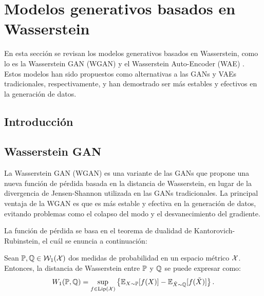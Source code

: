 \chapter{Modelos generativos basados en Wasserstein}
\label{chap:modelos-generativos-basados-en-Wasserstein}
{
    En esta sección se revisan los modelos generativos basados en Wasserstein, como lo es la Wasserstein GAN (WGAN) \cite{arjovsky2017wasserstein} y el Wasserstein Auto-Encoder (WAE) \cite{tolstikhin2017wasserstein}. Estos modelos han sido propuestos como alternativas a las GANs y VAEs tradicionales, respectivamente, y han demostrado ser más estables y efectivos en la generación de datos.

    \section{Introducción}\label{sec:model-gen-wass-Introducción}
    {

    }  %

    \section{Wasserstein GAN}\label{sec:WGAN}
    {
        La Wasserstein GAN (WGAN) \cite{arjovsky2017wasserstein} es una variante de las GANs que propone una nueva función de pérdida basada en la distancia de Wasserstein, en lugar de la divergencia de Jensen-Shannon utilizada en las GANs tradicionales. La principal ventaja de la WGAN es que es más estable y efectiva en la generación de datos, evitando problemas como el colapso del modo y el desvanecimiento del gradiente.

        La función de pérdida se basa en el teorema de dualidad de Kantorovich-Rubinstein, el cuál se enuncia a continuación:
        \begin{theorem}\label{thm:dualidad-kantorovich-rubinstein}
            Sean $\Prob, \ProbQ \in \WassersteinSpace[1]{\cX}$ dos medidas de probabilidad en un espacio métrico $\mathcal{X}$. Entonces, la distancia de Wasserstein entre $\Prob$ y $\ProbQ$ se puede expresar como:
            \begin{equation}\label{eq:dualidad-kantorovich-rubinstein}
                \Wasserstein[1]{\Prob}{\ProbQ} = \sup_{f \in \Lip[\cX]} \left\{ \Exp_{X\sim \Prob} [f(X)] - \Exp_{\tilde X \sim \ProbQ} [f(\tilde X)] \right\}.
            \end{equation}
        \end{theorem}

}}
